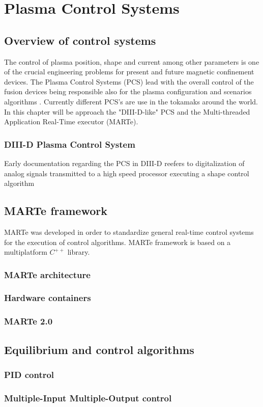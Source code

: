 \chapter{Plasma Control Systems}

\section{Overview of control systems}
The control of  plasma position, shape and current among other parameters is one of the crucial engineering problems for present and future magnetic confinement devices. The Plasma Control Systems (PCS) lead with the overall control of the fusion devices  being responsible also for the  plasma configuration and scenarios algorithms \cite[Chapter~8]{PCS_2018}. Currently different PCS's are use in the tokamaks around the world. In this chapter will be approach the "DIII-D-like" PCS and the Multi-threaded Application Real-Time executor (MARTe).

\subsection{DIII-D Plasma Control System}  

Early documentation regarding the PCS in DIII-D reefers to digitalization of analog signals transmitted to a high speed processor executing a shape control algorithm   \cite{DIIDcontrol}

\section{MARTe framework}

MARTe was developed in order to standardize general real-time control systems for the execution of control algorithms. MARTe framework is based on a multiplatform $C^{++}$ library. \cite{Neto2011} 

\subsection{MARTe architecture }
\subsection{Hardware containers}
\subsection{MARTe 2.0}
\section{Equilibrium and control algorithms} 
\subsection{PID control}
\subsection{Multiple-Input Multiple-Output control}